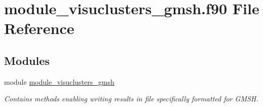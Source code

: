 \hypertarget{module__visuclusters__gmsh_8f90}{}\section{module\+\_\+visuclusters\+\_\+gmsh.\+f90 File Reference}
\label{module__visuclusters__gmsh_8f90}
\subsection*{Modules}
\begin{DoxyCompactItemize}
\item 
module \hyperlink{namespacemodule__visuclusters__gmsh}{module\+\_\+visuclusters\+\_\+gmsh}
\begin{DoxyCompactList}\small\item\em Contains methods enabling writing results in file specifically formatted for G\+M\+S\+H. \end{DoxyCompactList}\end{DoxyCompactItemize}

